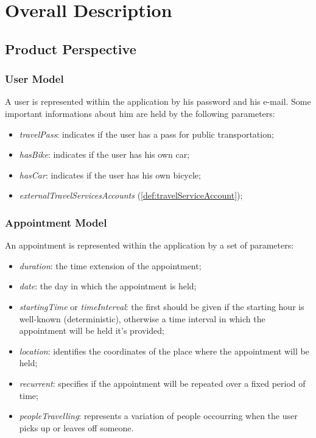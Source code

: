 \chapter{Overall Description}

\section{Product Perspective}

\subsection{User Model} \label{subsect:usermodel}
A user is represented within the application by his password and his e-mail. 
Some important informations about him are held by the following parameters:
\begin{itemize}
\item \textit{travelPass}: indicates if the user has a pass for public transportation;
\item \textit{hasBike}: indicates if the user has his own car;
\item \textit{hasCar}: indicates if the user has his own bicycle;
\item \textit{externalTravelServicesAccounts} (\ref{def:travelServiceAccount});
\end{itemize}

\subsection{Appointment Model} \label{subsect:appointmentmodel}
An appointment is represented within the application by a set of parameters:
\begin{itemize}
\item \textit{duration}: the time extension of the appointment;
\item \textit{date}: the day in which the appointment is held;
\item \textit{startingTime} or \textit{timeInterval}: the first should be given if the starting hour is well-known (deterministic), otherwise a time interval in which the appointment will be held it's provided;
\item \textit{location}: identifies the coordinates of the place where the appointment will be held;
\item \textit{recurrent}: specifies if the appointment will be repeated over a fixed period of time;
\item \textit{peopleTravelling}: represents a variation of people occourring when the user picks up or leaves off someone.
\end{itemize}

